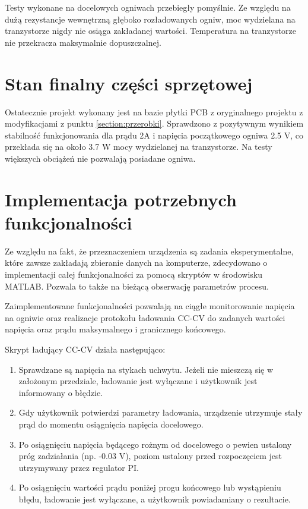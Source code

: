 \documentclass[polish,engineer]{polsl-msth}
\begin{document}
Testy wykonane na docelowych ogniwach przebiegły pomyślnie. Ze względu na dużą rezystancje wewnętrzną głęboko rozładowanych ogniw, moc wydzielana na tranzystorze nigdy nie osiąga zakładanej wartości. Temperatura na tranzystorze nie przekracza maksymalnie dopuszczalnej.

\section{Stan finalny części sprzętowej}
Ostatecznie projekt wykonany jest na bazie płytki PCB z oryginalnego projektu z modyfikacjami z punktu \ref{section:przerobki}. Sprawdzono z pozytywnym wynikiem stabilność funkcjonowania dla prądu 2A i napięcia początkowego ogniwa 2.5 V, co przekłada się na około 3.7 W mocy wydzielanej na tranzystorze. Na testy większych obciążeń nie pozwalają posiadane ogniwa.

\section{Implementacja potrzebnych funkcjonalności}
Ze względu na fakt, że przeznaczeniem urządzenia są zadania eksperymentalne, które zawsze zakładają zbieranie danych na komputerze, zdecydowano o implementacji całej funkcjonalności za pomocą skryptów w środowisku MATLAB. Pozwala to także na bieżącą obserwację parametrów procesu.

Zaimplementowane funkcjonalności pozwalają na ciągłe monitorowanie napięcia na ogniwie oraz realizacje protokołu ładowania CC-CV do zadanych wartości napięcia oraz prądu maksymalnego i granicznego końcowego.

Skrypt ładujący CC-CV działa następująco:
\begin{enumerate}
    \item Sprawdzane są napięcia na stykach uchwytu. Jeżeli nie mieszczą się w założonym przedziale, ładowanie jest wyłączane i użytkownik jest informowany o błędzie.
    \item Gdy użytkownik potwierdzi parametry ładowania, urządzenie utrzymuje stały prąd do momentu osiągnięcia napięcia docelowego.
    \item Po osiągnięciu napięcia będącego rożnym od docelowego o pewien ustalony próg zadziałania (np. -0.03 V), poziom ustalony przed rozpoczęciem jest utrzymywany przez regulator PI. 
    \item Po osiągnięciu wartości prądu poniżej progu końcowego lub wystąpieniu błędu, ładowanie jest wyłączane, a użytkownik powiadamiany o rezultacie.
\end{enumerate}
\end{document}
